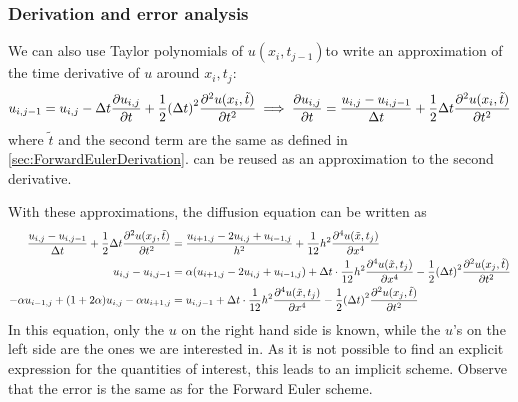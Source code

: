 \documentclass[12pt,english,a4paper]{article}
\begin{document}
\subsubsection{Derivation and error analysis}
We can also use Taylor polynomials of \(u(x_i,t_{j-1})\)to write an approximation of the time derivative of \(u\) around \(x_i,t_j\):
\[
    u_{i,j-1} = u_{i,j} - \Delta t\pdv{u_{i,j}}{t} + \frac{1}{2}\qty(\Delta t)^2\pdv[2]{u(x_i,\tilde{t})}{t}
    \implies \pdv{u_{i,j}}{t} = \frac{u_{i,j}-u_{i,j-1}}{\Delta t} + \frac{1}{2}\Delta t\pdv[2]{u(x_i,\tilde{t})}{t}
\]
where \(\tilde{t}\) and the second term are the same as defined in \vref{sec:ForwardEulerDerivation}.  can be reused as an approximation to the second derivative.

With these approximations, the diffusion equation can be written as
\begin{align*}
    \frac{u_{i,j}-u_{i,j-1}}{\Delta t} + \frac{1}{2}\Delta t\pdv[2]{u(x_j,\tilde{t})}{t}
    &= \frac{u_{i+1,j}  - 2u_{i,j} + u_{i-1,j}}{h^2} + \frac{1}{12}h^2\pdv[4]{u(\tilde{x},t_j)}{x}  \\
    u_{i,j}-u_{i,j-1} &= \alpha(u_{i+1,j}  - 2u_{i,j} + u_{i-1,j}) + \Delta t\cdot \frac{1}{12}h^2\pdv[4]{u(\tilde{x},t_j)}{x}  - \frac{1}{2}\qty(\Delta t)^2\pdv[2]{u(x_j,\tilde{t})}{t}\\
    -\alpha u_{i-1,j} + \qty(1+2\alpha)u_{i,j} - \alpha u_{i+1,j} &= u_{i,j-1} + \Delta t\cdot \frac{1}{12}h^2\pdv[4]{u(\tilde{x},t_j)}{x}  - \frac{1}{2}\qty(\Delta t)^2\pdv[2]{u(x_j,\tilde{t})}{t}
\end{align*}
In this equation, only the \(u\) on the right hand side is known, while the \(u\)'s on the left side are the ones we are interested in. As it is not possible to find an explicit expression for the quantities of interest, this leads to an implicit scheme. Observe that the error is the same as for the Forward Euler scheme.
\end{document}
